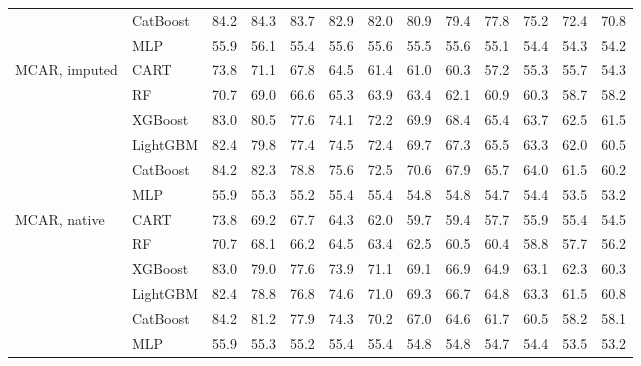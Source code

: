 \begin{table}[p]
\begin{tabular}{@{}llrrrrrrrrrrr@{}}
 & CatBoost & 84.2 & 84.3 & 83.7 & 82.9 & 82.0 & 80.9 & 79.4 & 77.8 & 75.2 & 72.4 & 70.8 \\
 & MLP & 55.9 & 56.1 & 55.4 & 55.6 & 55.6 & 55.5 & 55.6 & 55.1 & 54.4 & 54.3 & 54.2 \\
\midrule
MCAR, imputed & CART & 73.8 & 71.1 & 67.8 & 64.5 & 61.4 & 61.0 & 60.3 & 57.2 & 55.3 & 55.7 & 54.3 \\
 & RF & 70.7 & 69.0 & 66.6 & 65.3 & 63.9 & 63.4 & 62.1 & 60.9 & 60.3 & 58.7 & 58.2 \\
 & XGBoost & 83.0 & 80.5 & 77.6 & 74.1 & 72.2 & 69.9 & 68.4 & 65.4 & 63.7 & 62.5 & 61.5 \\
 & LightGBM & 82.4 & 79.8 & 77.4 & 74.5 & 72.4 & 69.7 & 67.3 & 65.5 & 63.3 & 62.0 & 60.5 \\
 & CatBoost & 84.2 & 82.3 & 78.8 & 75.6 & 72.5 & 70.6 & 67.9 & 65.7 & 64.0 & 61.5 & 60.2 \\
 & MLP & 55.9 & 55.3 & 55.2 & 55.4 & 55.4 & 54.8 & 54.8 & 54.7 & 54.4 & 53.5 & 53.2 \\
\midrule
MCAR, native & CART & 73.8 & 69.2 & 67.7 & 64.3 & 62.0 & 59.7 & 59.4 & 57.7 & 55.9 & 55.4 & 54.5 \\
 & RF & 70.7 & 68.1 & 66.2 & 64.5 & 63.4 & 62.5 & 60.5 & 60.4 & 58.8 & 57.7 & 56.2 \\
 & XGBoost & 83.0 & 79.0 & 77.6 & 73.9 & 71.1 & 69.1 & 66.9 & 64.9 & 63.1 & 62.3 & 60.3 \\
 & LightGBM & 82.4 & 78.8 & 76.8 & 74.6 & 71.0 & 69.3 & 66.7 & 64.8 & 63.3 & 61.5 & 60.8 \\
 & CatBoost & 84.2 & 81.2 & 77.9 & 74.3 & 70.2 & 67.0 & 64.6 & 61.7 & 60.5 & 58.2 & 58.1 \\
 & MLP & 55.9 & 55.3 & 55.2 & 55.4 & 55.4 & 54.8 & 54.8 & 54.7 & 54.4 & 53.5 & 53.2 \\
\bottomrule
\end{tabular}
\end{table}

